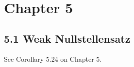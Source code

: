 \section{Chapter 5}

\subsection{5.1 Weak Nullstellensatz}

See \cite{atiyah1994introduction} Corollary 5.24 on Chapter 5.